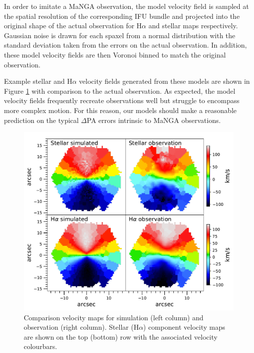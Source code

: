 In order to imitate a MaNGA observation, the model velocity field is sampled at the spatial resolution of the corresponding IFU bundle and projected into the original shape of the actual observation for H$\alpha$ and stellar maps respectively. Gaussian noise is drawn for each spaxel from a normal distribution with the standard deviation taken from the errors on the actual observation. In addition, these model velocity fields are then Voronoi binned to match the original observation.

Example stellar and H$\alpha$ velocity fields generated from these models are shown in Figure \ref{fig:sim_ifu} with comparison to the actual observation. As expected, the model velocity fields frequently recreate observations well but struggle to encompass more complex motion. For this reason, our models should make a reasonable prediction on the typical $\Delta$PA errors intrinsic to MaNGA observations.

\begin{figure}
	\includegraphics[width=\linewidth]{thesis/latex/kin_mis_files/obs_sim_IFU.pdf}
    \caption[Comparison velocity maps for simulation (left column) and observation (right column).]{Comparison velocity maps for simulation (left column) and observation (right column). Stellar (H$\alpha$) component velocity maps are shown on the top (bottom) row with the associated velocity colourbars.}
    \label{fig:sim_ifu}
\end{figure}

